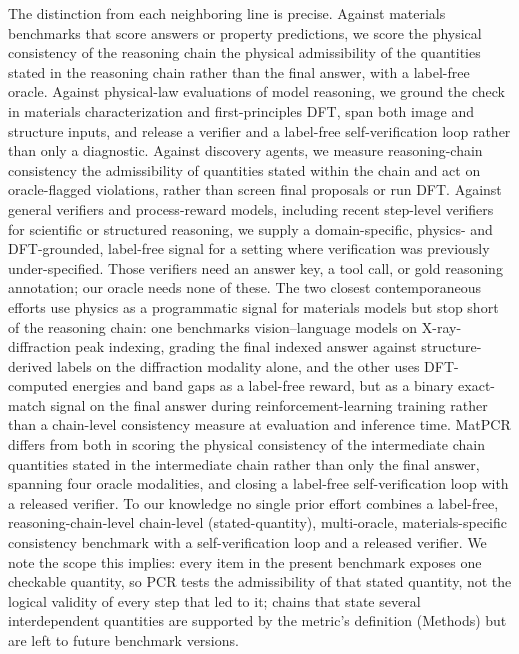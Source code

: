\documentclass[pdflatex,sn-nature]{sn-jnl}
\newcommand{\rev}[1]{#1} %
\newcommand{\rev}[1]{{\color{blue}#1}} %
\providecommand{\DIFadd}[1]{{\protect\color{blue} \sf #1}} %
\providecommand{\DIFdel}[1]{{\protect\color{red} \scriptsize #1}} %
\providecommand{\DIFaddbegin}{} %
\providecommand{\DIFaddend}{} %
\providecommand{\DIFdelbegin}{} %
\providecommand{\DIFdelend}{} %
\providecommand{\DIFscaledelfig}{0.5}
\newlength{\DIFdelgraphicswidth} %
\newlength{\DIFdelgraphicsheight} %
\providecommand{\DIFaddincludegraphics}[2][]{{\color{blue}\fbox{\DIFOincludegraphics[#1]{#2}}}} %
\providecommand{\DIFdelincludegraphics}[2][]{%
\sbox{\DIFdelgraphicsbox}{\DIFOincludegraphics[#1]{#2}}%
\settoboxwidth{\DIFdelgraphicswidth}{\DIFdelgraphicsbox} %
\settoboxtotalheight{\DIFdelgraphicsheight}{\DIFdelgraphicsbox} %
\scalebox{\DIFscaledelfig}{%
\parbox[b]{\DIFdelgraphicswidth}{\usebox{\DIFdelgraphicsbox}\\[-\baselineskip] \rule{\DIFdelgraphicswidth}{0em}}\llap{\resizebox{\DIFdelgraphicswidth}{\DIFdelgraphicsheight}{%
\setlength{\unitlength}{\DIFdelgraphicswidth}%
\begin{picture}(1,1)%
\thicklines\linethickness{2pt} %
{\color[rgb]{1,0,0}\put(0,0){\framebox(1,1){}}}%
{\color[rgb]{1,0,0}\put(0,0){\line( 1,1){1}}}%
{\color[rgb]{1,0,0}\put(0,1){\line(1,-1){1}}}%
\end{picture}%
}\hspace*{3pt}}} %
} %
\DeclareRobustCommand{\DIFaddbegin}{\DIFOaddbegin \let\includegraphics\DIFaddincludegraphics} %
\DeclareRobustCommand{\DIFaddend}{\DIFOaddend \let\includegraphics\DIFOincludegraphics} %
\DeclareRobustCommand{\DIFdelbegin}{\DIFOdelbegin \let\includegraphics\DIFdelincludegraphics} %
\DeclareRobustCommand{\DIFdelend}{\DIFOaddend \let\includegraphics\DIFOincludegraphics} %
\begin{document}
The distinction from each neighboring line is precise. Against materials benchmarks
that score answers or property predictions,\cite{lai2025materials,llm4matbench2024,atomworld2025,matterchat2026}
we score \DIFdelbegin \DIFdel{the physical consistency of the reasoning chain }\DIFdelend \DIFaddbegin \DIFadd{\rev{the physical admissibility of the quantities stated in the reasoning chain} }\DIFaddend rather than the final
answer, with a label-free oracle. Against physical-law evaluations of model
reasoning,\cite{conservationbench2026,p1vl2026} we ground the check in materials
characterization and first-principles DFT, span both image and structure inputs, and
release a verifier and a label-free self-verification loop rather than only a diagnostic.
Against discovery agents,\cite{dreams2025,physrej2025} we measure \DIFdelbegin \DIFdel{reasoning-chain
consistency }\DIFdelend \DIFaddbegin \DIFadd{\rev{the admissibility of
quantities stated within the chain} }\DIFaddend and act on oracle-flagged violations, rather than screen final proposals or
run DFT. Against general verifiers
and process-reward models,\cite{processbench2025,compassverifier2025,t1verify2025}
including recent step-level verifiers for scientific or structured reasoning,\cite{sciprm2026,vprm2026}
we supply a domain-specific, physics- and DFT-grounded, label-free signal for a setting
where verification was previously under-specified. Those verifiers need an answer key, a
tool call, or gold reasoning annotation; our oracle needs none of these. The two closest contemporaneous
efforts use physics as a programmatic signal for materials models but stop short of the
reasoning chain: one benchmarks vision--language models on X-ray-diffraction peak
indexing, grading the final indexed answer against structure-derived labels on the
diffraction modality alone,\cite{crystalxrdbench2026} and the other uses DFT-computed
energies and band gaps as a label-free reward, but as a binary exact-match signal on the
final answer during reinforcement-learning training rather than a chain-level
consistency measure at evaluation and inference time.\cite{matpref2026} MatPCR differs
from both in scoring \DIFdelbegin \DIFdel{the physical consistency of the intermediate chain}\DIFdelend \DIFaddbegin \DIFadd{\rev{quantities stated in the intermediate chain rather than only the final answer}}\DIFaddend , spanning four
oracle modalities, and closing a label-free self-verification loop with a released
verifier. To our knowledge no single prior effort combines a label-free,
\DIFdelbegin \DIFdel{reasoning-chain-level}\DIFdelend \DIFaddbegin \DIFadd{\rev{chain-level (stated-quantity)}}\DIFaddend , multi-oracle, materials-specific consistency benchmark with a
self-verification loop and a released verifier. \DIFaddbegin \DIFadd{\rev{We note the scope this implies: every item
in the present benchmark exposes one checkable quantity, so PCR tests the admissibility of that
stated quantity, not the logical validity of every step that led to it; chains that state several
interdependent quantities are supported by the metric's definition (Methods) but are left to
future benchmark versions.}
}\DIFaddend 
\end{document}
